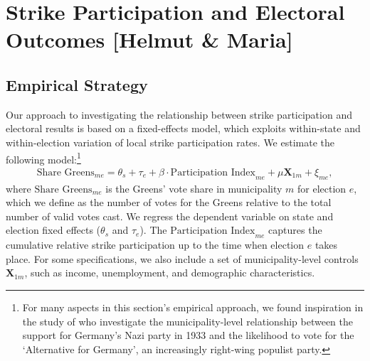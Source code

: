 \clearpage
\section{Strike Participation and Electoral Outcomes [Helmut \& Maria]}\label{sec_greta_cons:strike_participation_elections}



\subsection{Empirical Strategy}


Our approach to investigating the relationship between strike participation and electoral results is based on a fixed-effects model, which exploits within-state and within-election variation of local strike participation rates. We estimate the following model:\footnote{For many aspects in this section's empirical approach, we found inspiration in the study of \cite{cantoni2020persistence} who investigate the municipality-level relationship between the support for Germany's Nazi party in 1933 and the likelihood to vote for the `Alternative for Germany', an increasingly right-wing populist party.}
\begin{align}
	\text{Share Greens}_{me} = \theta_s + \tau_e + \beta\cdot\text{Participation Index}_{me} + \mu \mathbf{X}_{1m} + \xi_{me},\label{eq_greta_cons:vote_share_greens}
\end{align}
where $\text{Share Greens}_{me}$ is the Greens' vote share in municipality $m$ for election $e$, which we define as the number of votes for the Greens relative to the total number of valid votes cast. We regress the dependent variable on state and election fixed effects ($\theta_s$ and $\tau_e$). The $\text{Participation Index}_{me}$ captures the cumulative relative strike participation up to the time when election $e$ takes place. For some specifications, we also include a set of municipality-level controls $\mathbf{X}_{1m}$, such as income, unemployment, and demographic characteristics. 


